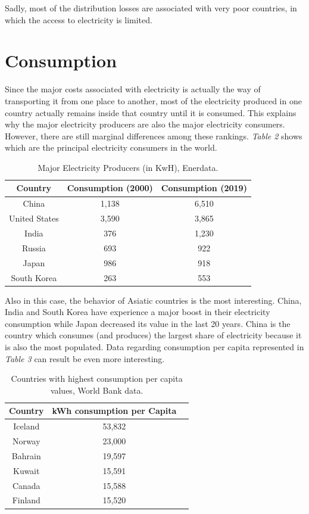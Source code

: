 \documentclass{book}
\begin{document}
Sadly, most of the distribution losses are associated with very poor countries, in which the access to electricity is limited. 

\section{Consumption}

Since the major costs associated with electricity is actually the way of transporting it from one place to another, most of the electricity produced in one country actually remains inside that country until it is consumed. This explains why the major electricity producers are also the major electricity consumers. However, there are still marginal differences among these rankings. \textit{Table 2} shows which are the principal electricity consumers in the world.

\bigskip
\begin{table}[H]
\begin{center}
\begin{tabular}{|c|c|c|}
\hline
Country & Consumption (2000) & Consumption (2019)\\
\hline
China & 1,138 & 6,510\\
United States & 3,590 & 3,865\\
India & 376 & 1,230\\
Russia & 693 & 922\\
Japan & 986 & 918\\
South Korea & 263 & 553\\
\hline
\end{tabular}
\caption{Major Electricity Producers (in KwH), Enerdata.}
\end{center}
\end{table}

Also in this case, the behavior of Asiatic countries is the most interesting. China, India and South Korea have experience a major boost in their electricity consumption while Japan decreased its value in the last 20 years. China is the country which consumes (and produces) the largest share of electricity because it is also the most populated. Data regarding consumption per capita represented in \textit{Table 3} can result be even more interesting.

\bigskip
\begin{table}[H]
\begin{center}
\begin{tabular}{|c|c|c|}
\hline
Country & kWh consumption per Capita\\
\hline
Iceland & 53,832\\
Norway & 23,000\\
Bahrain & 19,597\\
Kuwait & 15,591\\
Canada & 15,588\\
Finland & 15,520\\
\hline
\end{tabular}
\caption{Countries with highest consumption per capita values, World Bank data.}
\end{center}
\end{table}
\end{document}
